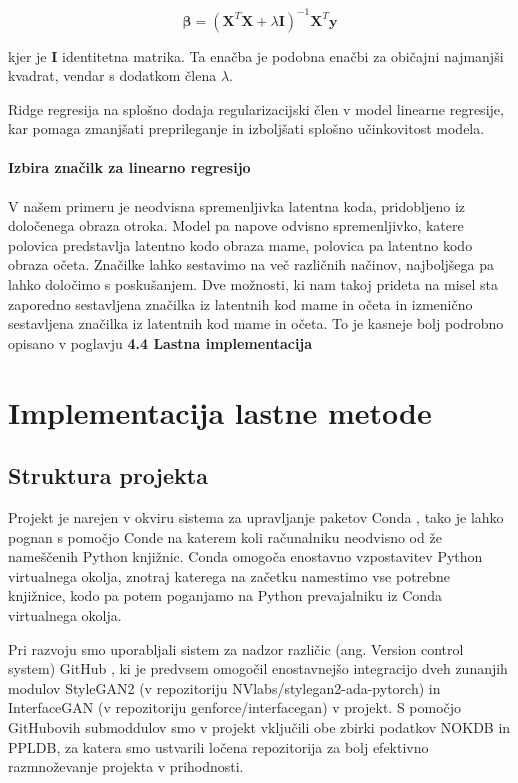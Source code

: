 \documentclass[a4paper,12pt,openright]{book}
\begin{document}
\begin{equation*}
\boldsymbol{\beta} = (\mathbf{X}^T \mathbf{X} + \lambda \mathbf{I})^{-1} \mathbf{X}^T \mathbf{y}
\end{equation*}


kjer je $\mathbf{I}$ identitetna matrika. Ta enačba je podobna enačbi za običajni najmanjši kvadrat, vendar s dodatkom člena $\lambda$.

Ridge regresija na splošno dodaja regularizacijski člen v model linearne regresije, kar pomaga zmanjšati preprileganje in izboljšati splošno učinkovitost modela.





\subsubsection{Izbira značilk za linearno regresijo}
V našem primeru je neodvisna spremenljivka latentna koda, pridobljeno iz določenega obraza otroka. Model pa napove odvisno spremenljivko, katere polovica predstavlja latentno kodo obraza mame, polovica pa latentno kodo obraza očeta. Značilke lahko sestavimo na več različnih načinov, najboljšega pa lahko določimo s poskušanjem. Dve možnosti, ki nam takoj prideta na misel sta zaporedno sestavljena značilka iz latentnih kod mame in očeta in izmenično sestavljena značilka iz latentnih kod mame in očeta. To je kasneje bolj podrobno opisano v poglavju \textbf{4.4 Lastna implementacija}



\chapter{Implementacija lastne metode}
\section{Struktura projekta}
Projekt je narejen v okviru sistema za upravljanje paketov Conda \cite{conda}, tako je lahko pognan s pomočjo Conde na katerem koli računalniku neodvisno od že nameščenih Python knjižnic. Conda omogoča enostavno vzpostavitev Python virtualnega okolja, znotraj katerega na začetku namestimo vse potrebne knjižnice, kodo pa potem poganjamo na Python prevajalniku iz Conda virtualnega okolja.

Pri razvoju smo uporabljali sistem za nadzor različic (ang. Version control system) GitHub \cite{github}, ki je predvsem omogočil enostavnejšo integracijo dveh zunanjih modulov StyleGAN2 (v repozitoriju NVlabs/stylegan2-ada-pytorch) \cite{stylegan2adapytorch} in InterfaceGAN (v repozitoriju genforce/interfacegan) \cite{interfacegan} v projekt. S pomočjo GitHubovih submoddulov smo v projekt vključili obe zbirki podatkov NOKDB in PPLDB, za katera smo ustvarili ločena repozitorija za bolj efektivno razmnoževanje projekta v prihodnosti.
\end{document}
